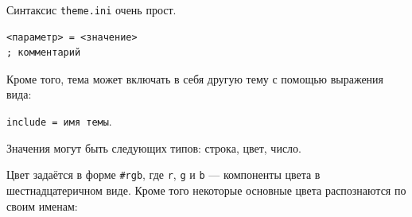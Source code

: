 \documentclass[a4paper,12pt]{article}
\begin{document}
Синтаксис \verb/theme.ini/ очень прост.

\begin{verbatim}
<параметр> = <значение>
; комментарий
\end{verbatim}

Кроме того, тема может включать в себя другую тему с помощью выражения вида: 

\verb/include = имя темы/.

Значения могут быть следующих типов: строка, цвет, число.

Цвет задаётся в форме \verb/#rgb/, где \verb/r/, \verb/g/ и \verb/b/ --- компоненты цвета в шестнадцатеричном виде. Кроме того некоторые основные цвета распознаются по своим именам:

\newcommand{\tabColor}[2]{
\texttt{#1} & \colorbox[HTML]{#2}{T.} 
}

\newcommand{\tabColorq}[8]{
\tabColor{#1}{#2} & \tabColor{#3}{#4} & \tabColor{#5}{#6} & \tabColor{#7}{#8} \\
\hline
}

\newcommand{\tabColort}[6]{
\tabColor{#1}{#2} & \tabColor{#3}{#4} & \tabColor{#5}{#6} & & \\
\hline
}
\end{document}
